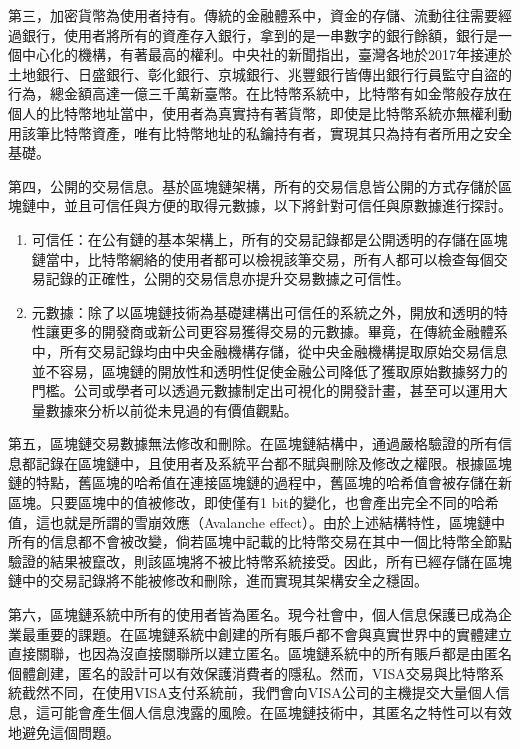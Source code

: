 				第三，加密貨幣為使用者持有。傳統的金融體系中，資金的存儲、流動往往需要經過銀行，使用者將所有的資產存入銀行，拿到的是一串數字的銀行餘額，銀行是一個中心化的機構，有著最高的權利。中央社的新聞\supercite{Bankguardsstolen}指出，臺灣各地於2017年接連於土地銀行、日盛銀行、彰化銀行、京城銀行、兆豐銀行皆傳出銀行行員監守自盜的行為，總金額高達一億三千萬新臺幣。在比特幣系統中，比特幣有如金幣般存放在個人的比特幣地址當中，使用者為真實持有著貨幣，即使是比特幣系統亦無權利動用該筆比特幣資產，唯有比特幣地址的私鑰持有者，實現其只為持有者所用之安全基礎。

				第四，公開的交易信息。基於區塊鏈架構，所有的交易信息皆公開的方式存儲於區塊鏈中，並且可信任與方便的取得元數據，以下將針對可信任與原數據進行探討。
				\begin{enumerate}
					\item 可信任：在公有鏈的基本架構上，所有的交易記錄都是公開透明的存儲在區塊鏈當中，比特幣網絡的使用者都可以檢視該筆交易，所有人都可以檢查每個交易記錄的正確性，公開的交易信息亦提升交易數據之可信性。
					\item 元數據：除了以區塊鏈技術為基礎建構出可信任的系統之外，開放和透明的特性讓更多的開發商或新公司更容易獲得交易的元數據。畢竟，在傳統金融體系中，所有交易記錄均由中央金融機構存儲，從中央金融機構提取原始交易信息並不容易，區塊鏈的開放性和透明性促使金融公司降低了獲取原始數據努力的門檻。公司或學者可以透過元數據制定出可視化的開發計畫，甚至可以運用大量數據來分析以前從未見過的有價值觀點。
				\end{enumerate}

				第五，區塊鏈交易數據無法修改和刪除。在區塊鏈結構中，通過嚴格驗證的所有信息都記錄在區塊鏈中，且使用者及系統平台都不賦與刪除及修改之權限。根據區塊鏈的特點，舊區塊的哈希值在連接區塊鏈的過程中，舊區塊的哈希值會被存儲在新區塊。只要區塊中的值被修改，即使僅有1 bit的變化，也會產出完全不同的哈希值，這也就是所謂的雪崩效應（Avalanche effect）\supercite{Theuseofbentsequencestoachievehigher-orderstrictavalanchecriterioninS-boxdesign}。由於上述結構特性，區塊鏈中所有的信息都不會被改變，倘若區塊中記載的比特幣交易在其中一個比特幣全節點驗證的結果被竄改，則該區塊將不被比特幣系統接受。因此，所有已經存儲在區塊鏈中的交易記錄將不能被修改和刪除，進而實現其架構安全之穩固。

				第六，區塊鏈系統中所有的使用者皆為匿名。現今社會中，個人信息保護已成為企業最重要的課題。在區塊鏈系統中創建的所有賬戶都不會與真實世界中的實體建立直接關聯，也因為沒直接關聯所以建立匿名。區塊鏈系統中的所有賬戶都是由匿名個體創建，匿名的設計可以有效保護消費者的隱私。然而，VISA交易與比特幣系統截然不同，在使用VISA支付系統前，我們會向VISA公司的主機提交大量個人信息，這可能會產生個人信息洩露的風險。在區塊鏈技術中，其匿名之特性可以有效地避免這個問題。

